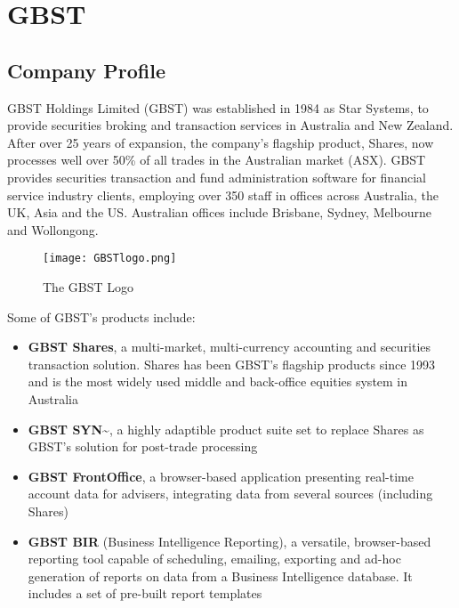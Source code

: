 \chapter{GBST}

\section{Company Profile}

GBST Holdings Limited (GBST) was established in 1984 as Star Systems, to provide securities broking and transaction services in Australia and New Zealand. After over 25 years of expansion, the company's flagship product, Shares, now processes well over 50\% of all trades in the Australian market (ASX). \cite{gbsthistory} GBST provides securities transaction and fund administration software for financial service industry clients, employing over 350 staff in offices across Australia, the UK, Asia and the US. Australian offices include Brisbane, Sydney, Melbourne and Wollongong. 
\vspace{0.5cm}
\begin{figure}[ht!]
\centering
\texttt{[image: GBSTlogo.png]}
\caption{The GBST Logo \cite{gbstlogo}}
\label{gbstlogo}
\end{figure}

Some of GBST's products include:

\begin{itemize}
\item \textbf{GBST Shares\texttrademark}, a multi-market, multi-currency accounting and securities transaction solution. Shares has been GBST's flagship products since 1993 and is the most widely used middle and back-office equities system in Australia \cite{gbstshares}
\item \textbf{GBST SYN\~}, a highly adaptible product suite set to replace Shares as GBST's solution for post-trade processing \cite{gbstsyn}
\item \textbf{GBST FrontOffice\texttrademark}, a browser-based application presenting real-time account data for advisers, integrating data from several sources (including Shares) \cite{gbstfrontoffice}
\item \textbf{GBST BIR\texttrademark} (Business Intelligence Reporting), a versatile, browser-based reporting tool capable of scheduling, emailing, exporting and ad-hoc generation of reports on data from a Business Intelligence database. \cite{gbstbir} It includes a set of pre-built report templates 
\end{itemize}

